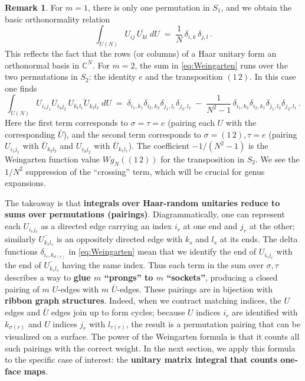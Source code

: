 \documentclass[letterpaper,11pt,oneside,reqno]{article}
\numberwithin{equation}{section}
\theoremstyle{definition}
\newtheorem{remark}[proposition]{Remark}
\begin{document}
\begin{remark}
For $m=1$, there is only one permutation in $S_1$, and we obtain the basic orthonormality relation
\[ \int_{U(N)} U_{ij}\,\overline{U_{kl}}\;dU \;=\; \frac{1}{N}\,\delta_{i,k}\,\delta_{j,l}\,. \]
This reflects the fact that the rows (or columns) of a Haar unitary form an orthonormal basis in $\mathbb{C}^N$. For $m=2$, the sum in \eqref{eq:Weingarten} runs over the two permutations in $S_2$: the identity $e$ and the transposition $(1\,2)$. In this case one finds
\[ \int_{U(N)} U_{i_1 j_1} U_{i_2 j_2}\,\overline{U_{k_1 l_1} U_{k_2 l_2}}\;dU \;=\; \delta_{i_1,k_1}\delta_{i_2,k_2}\delta_{j_1,l_1}\delta_{j_2,l_2}\;-\;\frac{1}{N^2-1}\,\delta_{i_1,k_2}\delta_{i_2,k_1}\delta_{j_1,l_2}\delta_{j_2,l_1}\,. \]
Here the first term corresponds to $\sigma=\tau=e$ (pairing each $U$ with the corresponding $\bar U$), and the second term corresponds to $\sigma=(1\,2), \tau=e$ (pairing $U_{i_1 j_1}$ with $\bar U_{k_2 l_2}$ and $U_{i_2 j_2}$ with $\bar U_{k_1 l_1}$). The coefficient $-1/(N^2-1)$ is the Weingarten function value $Wg_N((1\,2))$ for the transposition in $S_2$. We see the $1/N^2$ suppression of the ``crossing'' term, which will be crucial for genus expansions.
\end{remark}

The takeaway is that \textbf{integrals over Haar-random unitaries reduce to sums over permutations (pairings)}. Diagrammatically, one can represent each $U_{i_r j_r}$ as a directed edge carrying an index $i_r$ at one end and $j_r$ at the other; similarly $\overline{U_{k_s l_s}}$ is an oppositely directed edge with $k_s$ and $l_s$ at its ends. The delta functions $\delta_{i_r,k_{\sigma(r)}}$ in \eqref{eq:Weingarten} mean that we identify the end of $U_{i_r j_r}$ with the end of $\overline{U_{k_s l_s}}$ having the same index. Thus each term in the sum over $\sigma,\tau$ describes a way to \textbf{glue $m$ ``prongs'' to $m$ ``sockets''}, producing a closed pairing of $m$ $U$-edges with $m$ $\bar U$-edges. These pairings are in bijection with \textbf{ribbon graph structures}. Indeed, when we contract matching indices, the $U$ edges and $\bar U$ edges join up to form cycles; because $U$ indices $i_r$ are identified with $k_{\sigma(r)}$ and $U$ indices $j_r$ with $l_{\tau(r)}$, the result is a permutation pairing that can be visualized on a surface. The power of the Weingarten formula is that it counts all such pairings with the correct weight. In the next section, we apply this formula to the specific case of interest: the \textbf{unitary matrix integral that counts one-face maps}.
\end{document}

